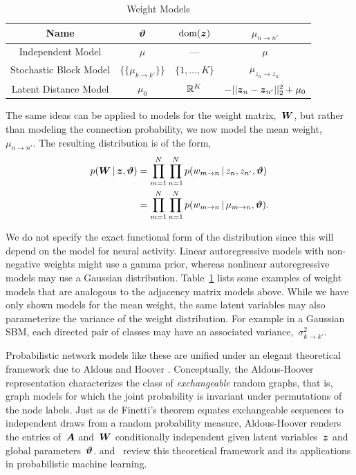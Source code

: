 \begin{table}
\begin{center}
\begin{tabular}{c|c|c|c}
Name & $\boldsymbol{\vartheta}$ & $\mathrm{dom}(\boldsymbol{z})$ & $\mu_{n \to n'}$ \\
\hline
Independent Model & $\mu$ & --- & $\mu$ \\
Stochastic Block Model & $\{\{ \mu_{k \to k'} \}\}$ & $\{1, \ldots, K\}$ & $\mu_{z_n \to z_{n'}}$ \\
Latent Distance Model & $\mu_0$ & $\mathbb{R}^K$ & $-||\boldsymbol{z}_n - \boldsymbol{z}_{n'}||_2^2 + \mu_0$ 
\end{tabular}
\end{center}
\caption{Weight Models}
\label{tab:W_models}
\end{table}

The same ideas can be applied to models for the weight matrix,~$\boldsymbol{W}$,
but rather than modeling the connection probability, we now model the
mean weight,~$\mu_{n \to n'}$. The resulting distribution is of the form,
\begin{align*}
  p(\boldsymbol{W} \,|\, \boldsymbol{z}, \boldsymbol{\vartheta})
  &= \prod_{m=1}^N \prod_{n=1}^N p(w_{m \to n} \,|\, z_n, z_{n'}, \boldsymbol{\vartheta}) \\
  &= \prod_{m=1}^N \prod_{n=1}^N p(w_{m \to n} \,|\, \mu_{m \to n}, \boldsymbol{\vartheta}).
\end{align*}

We do not specify the exact functional form of the distribution since
this will depend on the model for neural activity. Linear
autoregressive models with non-negative weights might use a gamma
prior, whereas nonlinear autoregressive models may use a Gaussian
distribution. Table~\ref{tab:W_models} lists some examples of weight
models that are analogous to the adjacency matrix models above.
While we have only shown models for the mean weight,
the same latent variables may
also parameterize the variance of the weight distribution. For example
in a Gaussian SBM, each directed pair of classes may have an
associated variance,~$\sigma^2_{k \to k'}$.


Probabilistic network models like these are unified under an elegant
theoretical framework due to Aldous and Hoover
\cite{Aldous-1981,Hoover-1979}. Conceptually, the Aldous-Hoover
representation characterizes the class of \textit{exchangeable} random
graphs, that is, graph models for which the joint probability is
invariant under permutations of the node labels. Just as de Finetti's
theorem equates exchangeable sequences to independent draws from a
random probability measure, Aldous-Hoover renders the entries of~$\boldsymbol{A}$ and~$\boldsymbol{W}$ conditionally
independent given latent variables~$\boldsymbol{z}$ and global
parameters~$\boldsymbol{\vartheta}$. \citet{Lloyd-2012} and~\citet{orbanz2015bayesian}
review this theoretical framework and its applications in
probabilistic machine learning.

